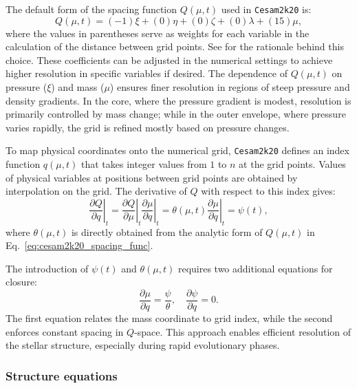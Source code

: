 \documentclass[12pt,a4paper]{article}
\newcommand{\pfird}[2][]{\frac{\partial#1}{\partial#2}}
\begin{document}
The default form of the spacing function $Q(\mu, t)$ used in \texttt{Cesam2k20} is:
\begin{equation}
  Q(\mu, t) = (-1)\xi + (0)\eta + (0)\zeta + (0)\lambda + (15)\mu, \label{eq:cesam2k20_spacing_func}
\end{equation}
where the values in parentheses serve as weights for each variable in the calculation of the distance between grid points. See \textcite{Morel1997,Manchon2021} for the rationale behind this choice. These coefficients can be adjusted in the numerical settings to achieve higher resolution in specific variables if desired. The dependence of $Q(\mu, t)$ on pressure ($\xi$) and mass ($\mu$) ensures finer resolution in regions of steep pressure and density gradients. In the core, where the pressure gradient is modest, resolution is primarily controlled by mass change; while in the outer envelope, where pressure varies rapidly, the grid is refined mostly based on pressure changes.

To map physical coordinates onto the numerical grid, \texttt{Cesam2k20} defines an index function $q(\mu, t)$ that takes integer values from $1$ to $n$ at the grid points. Values of physical variables at positions between grid points are obtained by interpolation on the grid. The derivative of $Q$ with respect to this index gives:
\begin{equation}
  \left.\pfird[Q]{q}\right|_t = \left.\pfird[Q]{\mu}\right|_t\left.\pfird[\mu]{q}\right|_t = \theta(\mu, t)\left.\pfird[\mu]{q}\right|_t = \psi(t),
\end{equation}
where $\theta(\mu, t)$ is directly obtained from the analytic form of $Q(\mu, t)$ in Eq.~\eqref{eq:cesam2k20_spacing_func}.

The introduction of $\psi(t)$ and $\theta(\mu, t)$ requires two additional equations for closure:
\begin{equation}
  \pfird[\mu]{q} = \frac{\psi}{\theta},\quad \pfird[\psi]{q} = 0.
\end{equation}
The first equation relates the mass coordinate to grid index, while the second enforces constant spacing in $Q$-space. This approach enables efficient resolution of the stellar structure, especially during rapid evolutionary phases.

\subsubsection{Structure equations}
\label{sec:cesam2k20_struct_eq}
\end{document}
